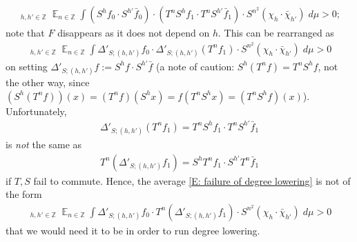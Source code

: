 \documentclass[11pt]{amsart}
\theoremstyle{definition}
\DeclareMathOperator*{\oE}{\overline{\mathbb{E}}}
\DeclareMathOperator*{\E}{\mathbb{E}}
\newcommand{\Z}{{\mathbb Z}}
\newcommand{\1}{{\mathbf{1}}}
\begin{document}
\begin{align*}
    \oE_{h,h'\in\Z} \E_{n\in\Z}\int (S^hf_0\cdot S^{h'}\bar f_0)\cdot (T^n S^h f_1\cdot T^n S^{h'} \bar f_1) \cdot S^{n^2}(\chi_h\cdot \bar\chi_{h'})\; d\mu > 0;
\end{align*}
{note that $F$ disappears as it does not depend on $h$.}
This can be rearranged as
\begin{align}\label{E: failure of degree lowering}
    \oE_{h,h'\in\Z} \E_{n\in\Z}\int \Delta'_{S; (h,h')}f_0 \cdot \Delta'_{S; (h,h')}(T^n f_1) \cdot S^{n^2}(\chi_h\cdot \bar\chi_{h'})\; d\mu > 0
\end{align}
on setting $\Delta'_{S; (h,h')}f:=S^h f\cdot S^{h'}\bar f$ (a note of caution: $S^h(T^nf) = T^nS^hf$, not the other way, since $(S^h(T^nf))(x) = (T^n f)(S^hx) = f(T^nS^h x)=(T^nS^hf)(x)$). Unfortunately, 
\begin{align*}
    \Delta'_{S; (h,h')}(T^n f_1) = T^n S^h f_1\cdot T^n S^{h'} \bar f_1
\end{align*}
is \textit{not} the same as
\begin{align*}
    T^n(\Delta'_{S; (h,h')} f_1) = S^h T^n f_1 \cdot S^{h'} T^n \bar f_1
\end{align*}
if $T, S$ fail to commute. Hence, the average \eqref{E: failure of degree lowering} is not of the form
\begin{align*}
    \oE_{h,h'\in\Z} \E_{n\in\Z}\int \Delta'_{S; (h,h')}f_0 \cdot T^n(\Delta'_{S; (h,h')} f_1) \cdot S^{n^2}(\chi_h\cdot \bar\chi_{h'})\; d\mu > 0
\end{align*}
that we would need it to be in order to run degree lowering.
\end{document}
